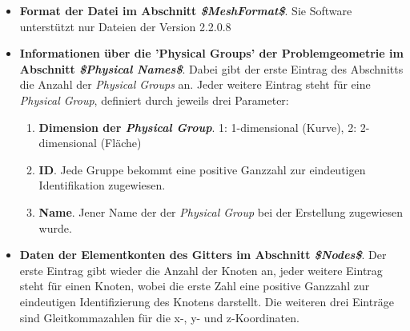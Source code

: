 \begin{itemize}
	\item \textbf{Format der Datei im Abschnitt \textit{\$MeshFormat\$}}. Sie Software unterstützt nur Dateien der Version 2.2.0.8
	
	\item \textbf{Informationen über die 'Physical Groups' der Problemgeometrie im Abschnitt \textit{\$Physical Names\$}}. Dabei gibt der erste Eintrag des Abschnitts die Anzahl der \textit{Physical Groups} an. Jeder weitere Eintrag steht für eine \textit{Physical Group}, definiert durch jeweils drei Parameter:
	\begin{enumerate}
		\item \textbf{Dimension der \textit{Physical Group}}. 1: 1-dimensional (Kurve), 2: 2-dimensional (Fläche)
		\item \textbf{ID}. Jede Gruppe bekommt eine positive Ganzzahl zur eindeutigen Identifikation zugewiesen.
		\item \textbf{Name}. Jener Name der der \textit{Physical Group} bei der Erstellung zugewiesen wurde.
	\end{enumerate}

	\item \textbf{Daten der Elementkonten des Gitters im Abschnitt \textit{\$Nodes\$}}. Der erste Eintrag gibt wieder die Anzahl der Knoten an, jeder weitere Eintrag steht für einen Knoten, wobei die erste Zahl eine positive Ganzzahl zur eindeutigen Identifizierung des Knotens darstellt. Die weiteren drei Einträge sind Gleitkommazahlen für die x-, y- und z-Koordinaten.
	

\end{itemize}
